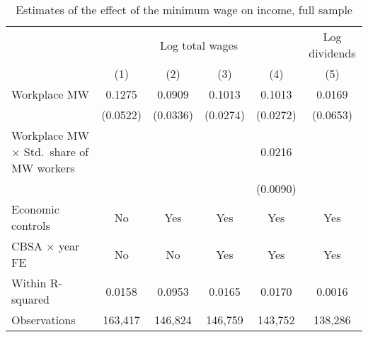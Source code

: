 \begin{table}[hbt!]
    \centering
    \caption{Estimates of the effect of the minimum wage on income, full sample}
    \label{tab:static_wages}

    \begin{tabular}{@{}lccccc@{}}
        \toprule
                                & \multicolumn{4}{c}{Log total wages}
                                & \multicolumn{1}{c}{Log dividends}                        \\ \cmidrule(lr){2-5}\cmidrule(lr){6-6}
                                & (1)       & (2)      & (3)      & (4)       & (5)        \\ \midrule
        Workplace MW            & 0.1275       & 0.0909      & 0.1013      & 0.1013       & 0.0169        \\
                                & (0.0522)     & (0.0336)    & (0.0274)    & (0.0272)     & (0.0653)      \\
        Workplace MW $\times$ Std.\ 
            share of MW workers &           &          &          & 0.0216       &            \\
                                &           &          &          & (0.0090)     &            \\ \midrule
        Economic controls       & No        & Yes      & Yes      & Yes       & Yes        \\
        CBSA $\times$ year FE   & No        & No       & Yes      & Yes       & Yes        \\
        Within R-squared        & 0.0158       & 0.0953      & 0.0165      & 0.0170       & 0.0016        \\
        Observations            & 163,417      & 146,824     & 146,759     & 143,752      & 138,286       \\ \bottomrule
    \end{tabular}


\end{table}
